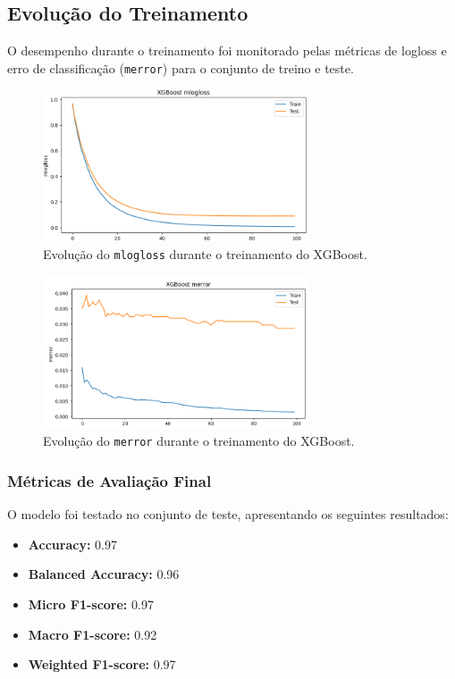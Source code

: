 \documentclass[11pt]{article}
\begin{document}
\subsection{Evolução do Treinamento}

O desempenho durante o treinamento foi monitorado pelas métricas de logloss e erro de classificação (\texttt{merror}) para o conjunto de treino e teste.

\begin{figure}[H]
    \centering
    \includegraphics[width=0.7\textwidth]{img/mlogloss.png}
    \caption{Evolução do \texttt{mlogloss} durante o treinamento do XGBoost.}
    \label{fig:mlogloss}
\end{figure}

\begin{figure}[H]
    \centering
    \includegraphics[width=0.7\textwidth]{img/merror.png}
    \caption{Evolução do \texttt{merror} durante o treinamento do XGBoost.}
    \label{fig:merror}
\end{figure}

\subsubsection{Métricas de Avaliação Final}

O modelo foi testado no conjunto de teste, apresentando os seguintes resultados:

\begin{itemize}
    \item \textbf{Accuracy:} 0.97
    \item \textbf{Balanced Accuracy:} 0.96
    \item \textbf{Micro F1-score:} 0.97
    \item \textbf{Macro F1-score:} 0.92
    \item \textbf{Weighted F1-score:} 0.97
\end{itemize}
\end{document}
